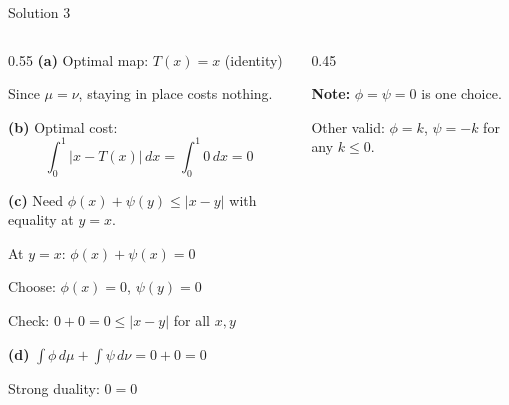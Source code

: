 \documentclass[aspectratio=169]{beamer}
\begin{document}
\begin{frame}{Solution 3}
\begin{columns}
\begin{column}{0.55\textwidth}
\textbf{(a)} Optimal map: $T(x) = x$ (identity)

Since $\mu = \nu$, staying in place costs nothing.

\vspace{0.2cm}
\textbf{(b)} Optimal cost:
\[
\int_0^1 |x - T(x)| \, dx = \int_0^1 0 \, dx = 0
\]

\vspace{0.2cm}
\textbf{(c)} Need $\phi(x) + \psi(y) \leq |x-y|$ with equality at $y = x$.

At $y = x$: $\phi(x) + \psi(x) = 0$

Choose: $\phi(x) = 0$, $\psi(y) = 0$

Check: $0 + 0 = 0 \leq |x-y|$ for all $x,y$ \checkmark

\vspace{0.2cm}
\textbf{(d)} $\int \phi \, d\mu + \int \psi \, d\nu = 0 + 0 = 0$

Strong duality: $0 = 0$ \checkmark
\end{column}
\begin{column}{0.45\textwidth}
\begin{center}

\vspace{0.3cm}
\textbf{Note:} $\phi = \psi = 0$ is one choice.

Other valid: $\phi = k$, $\psi = -k$ for any $k \leq 0$.
\end{center}
\end{column}
\end{columns}
\end{frame}
\end{document}
